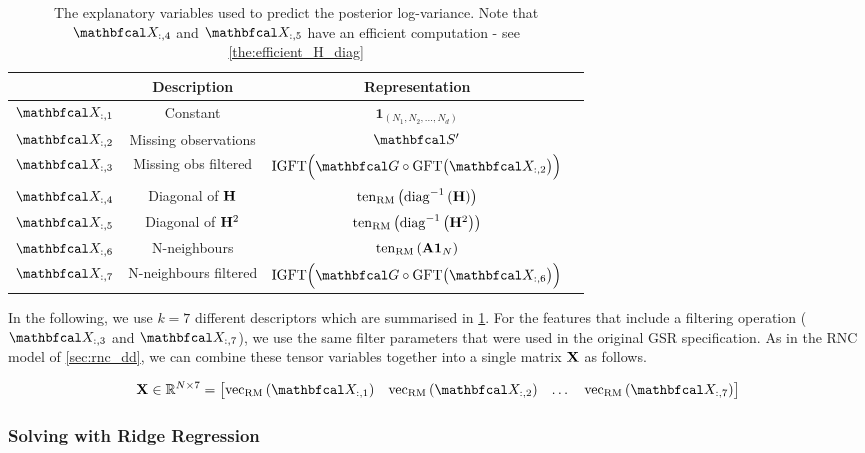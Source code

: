 \begin{table}[t]
    \renewcommand{\arraystretch}{1.7}
    \centering
    \begin{tabular}{|c|c|c|c|}
    \hline
     & \textbf{Description} & \textbf{Representation}\\
    \hline
    $\Xt_{:,1}$ &  Constant & $\mathbf{1}_{(N_1, N_2, ..., N_d)}$ \\
    \hline
    $\Xt_{:,2}$ & Missing observations & $\St'$  \\
    \hline
    $\Xt_{:,3}$ & Missing obs filtered & $\text{IGFT} \Big(\Gt \circ \text{GFT}\big(\Xt_{:,2}\big)\Big)$ \\
    \hline 
    $\Xt_{:,4}$ &  Diagonal of $\mathbf{H}$ & $\text{\textup{ten}}_{\text{\textup{RM}}}\left(\text{\textup{diag}}^{-1}\left(\mathbf{H}\right)\right)$ \\
    \hline 
    $\Xt_{:,5}$ & Diagonal of $\mathbf{H}^2$ & $\text{\textup{ten}}_{\text{\textup{RM}}}\left(\text{\textup{diag}}^{-1}\left(\mathbf{H}^2\right)\right)$ \\
    \hline
    $\Xt_{:,6}$ &  N-neighbours & $\text{\textup{ten}}_{\text{\textup{RM}}}\left(\mathbf{A} \mathbf{1}_N\right)$\\
    \hline
    $\Xt_{:,7}$  & N-neighbours filtered &  $\text{IGFT} \Big(\Gt \circ \text{GFT}\big(\Xt_{:,6}\big)\Big)$ \\
    \hline
\end{tabular}
\caption[The explanatory variables used to predict the posterior log-variance]{\small{The explanatory variables used to predict the posterior log-variance. Note that $\Xt_{:,4}$ and $\Xt_{:,5}$ have an efficient computation - see \cref{the:efficient_H_diag} }}
\label{tab:post_cov_features}
\end{table}


In the following, we use $k=7$ different descriptors which are summarised in \cref{tab:post_cov_features}. For the features that include a filtering operation ($\Xt_{:,3}$ and $\Xt_{:,7}$), we use the same filter parameters that were used in the original GSR specification. As in the RNC model of \cref{sec:rnc_dd}, we can combine these tensor variables together into a single matrix $\mathbf{X}$ as follows. 

\begin{equation}
    \X \in \R^{N \times 7} = \begin{bmatrix} \vecrm{\Xt_{:, 1}} & \vecrm{\Xt_{:, 2}} & \dots & \vecrm{\Xt_{:, 7}} \end{bmatrix}    
\end{equation}



\subsubsection{Solving with Ridge Regression}

